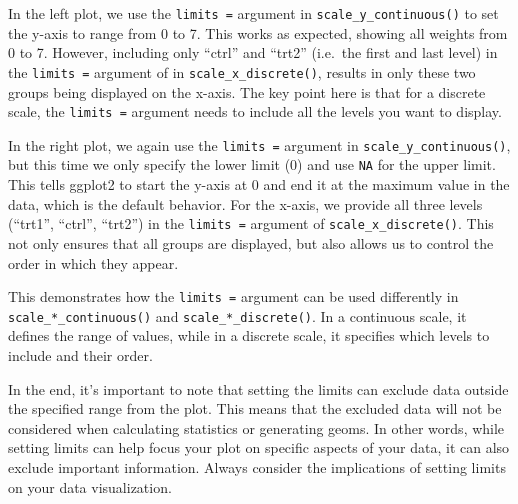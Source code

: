 \documentclass[
  letterpaper,
  DIV=11,
  numbers=noendperiod]{scrartcl}
\begin{document}
In the left plot, we use the \texttt{limits\ =} argument in
\texttt{scale\_y\_continuous()} to set the y-axis to range from 0 to 7.
This works as expected, showing all weights from 0 to 7. However,
including only ``ctrl'' and ``trt2'' (i.e.~the first and last level) in
the \texttt{limits\ =} argument of in \texttt{scale\_x\_discrete()},
results in only these two groups being displayed on the x-axis. The key
point here is that for a discrete scale, the \texttt{limits\ =} argument
needs to include all the levels you want to display.

In the right plot, we again use the \texttt{limits\ =} argument in
\texttt{scale\_y\_continuous()}, but this time we only specify the lower
limit (0) and use \texttt{NA} for the upper limit. This tells ggplot2 to
start the y-axis at 0 and end it at the maximum value in the data, which
is the default behavior. For the x-axis, we provide all three levels
(``trt1'', ``ctrl'', ``trt2'') in the \texttt{limits\ =} argument of
\texttt{scale\_x\_discrete()}. This not only ensures that all groups are
displayed, but also allows us to control the order in which they appear.

This demonstrates how the \texttt{limits\ =} argument can be used
differently in \texttt{scale\_*\_continuous()} and
\texttt{scale\_*\_discrete()}. In a continuous scale, it defines the
range of values, while in a discrete scale, it specifies which levels to
include and their order.

In the end, it's important to note that setting the limits can exclude
data outside the specified range from the plot. This means that the
excluded data will not be considered when calculating statistics or
generating geoms. In other words, while setting limits can help focus
your plot on specific aspects of your data, it can also exclude
important information. Always consider the implications of setting
limits on your data visualization.
\end{document}
